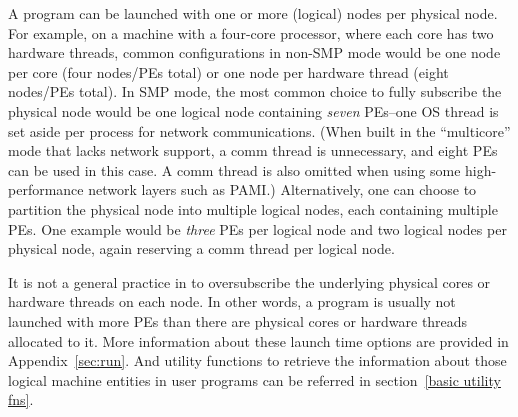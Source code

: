 A \charmpp{} program can be launched with one or more
(logical) nodes per physical node. For example, on a machine with a four-core
processor, where each core has two hardware threads, common configurations in
non-SMP mode would be one node per core (four nodes/PEs total) or one node per
hardware thread (eight nodes/PEs total). In SMP mode, the most common choice to
fully subscribe the physical node would be one logical node containing
{\em seven} PEs--one OS thread is set aside per process for network
communications. (When built in the ``multicore'' mode that lacks network
support, a comm thread is unnecessary, and eight PEs can be used in this case.
A comm thread is also omitted when using some high-performance network layers
such as PAMI.)
Alternatively, one can choose to partition the physical node into multiple
logical nodes, each containing multiple PEs. One example would be {\em three}
PEs per logical node and two logical nodes per physical node, again reserving
a comm thread per logical node.

It is not a general practice in \charmpp{} to oversubscribe the underlying
physical cores or hardware threads on each node. In other words, a
\charmpp{} program is usually not launched with more PEs than there
are physical cores or hardware threads allocated to it. More information about
these launch time options are provided in Appendix~\ref{sec:run}.
And utility functions to retrieve the information about those
\charmpp{} logical machine entities in user programs can be referred
in section~\ref{basic utility fns}.
